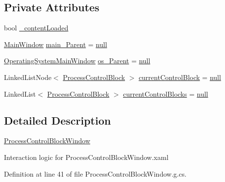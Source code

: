\subsection*{Private Attributes}
\begin{DoxyCompactItemize}
\item 
bool \hyperlink{class_c_p_u___o_s___simulator_1_1_process_control_block_window_aaac6850cf52e098a288515276eee98e0}{\+\_\+content\+Loaded}
\item 
\hyperlink{class_c_p_u___o_s___simulator_1_1_main_window}{Main\+Window} \hyperlink{class_c_p_u___o_s___simulator_1_1_process_control_block_window_a928d5159874200e6ca0fad00913d65e5}{main\+\_\+\+Parent} = \hyperlink{_old_01_process_01_flags_8cs_afb8e110345c45e74478894341ab6b28e}{null}
\item 
\hyperlink{class_c_p_u___o_s___simulator_1_1_operating_system_main_window}{Operating\+System\+Main\+Window} \hyperlink{class_c_p_u___o_s___simulator_1_1_process_control_block_window_acc4b72c5370a2bcda85b16e0801ce3d9}{os\+\_\+\+Parent} = \hyperlink{_old_01_process_01_flags_8cs_afb8e110345c45e74478894341ab6b28e}{null}
\item 
Linked\+List\+Node$<$ \hyperlink{class_c_p_u___o_s___simulator_1_1_operating___system_1_1_process_control_block}{Process\+Control\+Block} $>$ \hyperlink{class_c_p_u___o_s___simulator_1_1_process_control_block_window_a6019633d26586b0df1c4c2d6f008f6c9}{current\+Control\+Block} = \hyperlink{_old_01_process_01_flags_8cs_afb8e110345c45e74478894341ab6b28e}{null}
\item 
Linked\+List$<$ \hyperlink{class_c_p_u___o_s___simulator_1_1_operating___system_1_1_process_control_block}{Process\+Control\+Block} $>$ \hyperlink{class_c_p_u___o_s___simulator_1_1_process_control_block_window_a1cc81320d60155abc2d1fd7370aeeb9a}{current\+Control\+Blocks} = \hyperlink{_old_01_process_01_flags_8cs_afb8e110345c45e74478894341ab6b28e}{null}
\end{DoxyCompactItemize}


\subsection{Detailed Description}
\hyperlink{class_c_p_u___o_s___simulator_1_1_process_control_block_window}{Process\+Control\+Block\+Window} 

Interaction logic for Process\+Control\+Block\+Window.\+xaml 

Definition at line 41 of file Process\+Control\+Block\+Window.\+g.\+cs.



